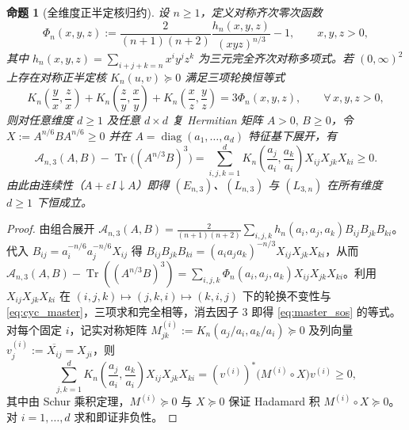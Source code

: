 \documentclass[11pt,a4paper]{article}
\newtheorem{proposition}[theorem]{命题}
\theoremstyle{remark}
\newcommand{\Tr}{\operatorname{Tr}}
\begin{document}
\begin{proposition}[全维度正半定核归约]\label{prop:framework}
设 $n\ge 1$，定义对称齐次零次函数
\[
\Phi_n(x,y,z) := \frac{2}{(n+1)(n+2)}\frac{h_n(x,y,z)}{(xyz)^{n/3}} - 1, \qquad x,y,z > 0,
\]
其中 $h_n(x,y,z) = \sum_{i+j+k=n} x^i y^j z^k$ 为三元完全齐次对称多项式。若 $(0,\infty)^2$ 上存在对称正半定核 $K_n(u,v) \succeq 0$ 满足三项轮换恒等式
\begin{equation}\label{eq:cyc_master}
  K_n\!\left(\frac{y}{x},\frac{z}{x}\right) + K_n\!\left(\frac{z}{y},\frac{x}{y}\right) + K_n\!\left(\frac{x}{z},\frac{y}{z}\right) = 3\Phi_n(x,y,z), \qquad \forall\, x,y,z > 0,
\end{equation}
则对任意维度 $d\ge 1$ 及任意 $d\times d$ 复 Hermitian 矩阵 $A > 0,\, B \ge 0$，令 $X := A^{n/6} B A^{n/6} \ge 0$ 并在 $A = \operatorname{diag}(a_1,\dots,a_d)$ 特征基下展开，有
\begin{equation}\label{eq:master_sos}
  \mathcal{A}_{n,3}(A,B) - \Tr\!\big((A^{n/3}B)^3\big)
  = \sum_{i,j,k=1}^d K_n\!\left(\frac{a_j}{a_i},\frac{a_k}{a_i}\right) X_{ij} X_{jk} X_{ki} \ge 0.
\end{equation}
由此由连续性（$A+\varepsilon I \downarrow A$）即得 $(E_{n,3})$、$(L_{n,3})$ 与 $(L_{3,n})$ 在所有维度 $d\ge 1$ 下恒成立。
\end{proposition}

\begin{proof}
由组合展开 $\mathcal{A}_{n,3}(A,B) = \frac{2}{(n+1)(n+2)}\sum_{i,j,k} h_n(a_i,a_j,a_k) B_{ij} B_{jk} B_{ki}$。代入 $B_{ij} = a_i^{-n/6} a_j^{-n/6} X_{ij}$ 得 $B_{ij}B_{jk}B_{ki} = (a_i a_j a_k)^{-n/3} X_{ij} X_{jk} X_{ki}$，从而 $\mathcal{A}_{n,3}(A,B) - \Tr((A^{n/3}B)^3) = \sum_{i,j,k}\Phi_n(a_i,a_j,a_k) X_{ij} X_{jk} X_{ki}$。利用 $X_{ij}X_{jk}X_{ki}$ 在 $(i,j,k)\mapsto(j,k,i)\mapsto(k,i,j)$ 下的轮换不变性与 \eqref{eq:cyc_master}，三项求和完全相等，消去因子 $3$ 即得 \eqref{eq:master_sos} 的等式。对每个固定 $i$，记实对称矩阵 $M^{(i)}_{jk} := K_n(a_j/a_i, a_k/a_i) \succeq 0$ 及列向量 $v^{(i)}_j := \overline{X_{ij}} = X_{ji}$，则
\[
\sum_{j,k=1}^d K_n\!\left(\frac{a_j}{a_i},\frac{a_k}{a_i}\right) X_{ij} X_{jk} X_{ki}
= (v^{(i)})^* \big(M^{(i)} \circ X\big) v^{(i)} \ge 0,
\]
其中由 Schur 乘积定理，$M^{(i)} \succeq 0$ 与 $X \succeq 0$ 保证 Hadamard 积 $M^{(i)} \circ X \succeq 0$。对 $i=1,\dots,d$ 求和即证非负性。
\end{proof}
\end{document}
